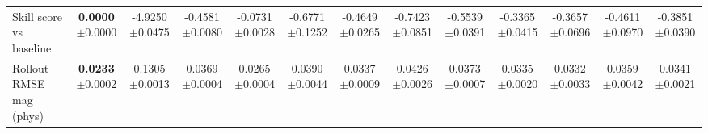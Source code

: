 \begin{table}[t]
{\begin{tabular}{lcccccccccccc}
Skill score vs baseline & \makecell{\textbf{0.0000}\\[-2pt]{\scriptsize$\pm$0.0000}} & \makecell{-4.9250\\[-2pt]{\scriptsize$\pm$0.0475}} & \makecell{-0.4581\\[-2pt]{\scriptsize$\pm$0.0080}} & \makecell{-0.0731\\[-2pt]{\scriptsize$\pm$0.0028}} & \makecell{-0.6771\\[-2pt]{\scriptsize$\pm$0.1252}} & \makecell{-0.4649\\[-2pt]{\scriptsize$\pm$0.0265}} & \makecell{-0.7423\\[-2pt]{\scriptsize$\pm$0.0851}} & \makecell{-0.5539\\[-2pt]{\scriptsize$\pm$0.0391}} & \makecell{-0.3365\\[-2pt]{\scriptsize$\pm$0.0415}} & \makecell{-0.3657\\[-2pt]{\scriptsize$\pm$0.0696}} & \makecell{-0.4611\\[-2pt]{\scriptsize$\pm$0.0970}} & \makecell{-0.3851\\[-2pt]{\scriptsize$\pm$0.0390}} \\
Rollout RMSE mag (phys) & \makecell{\textbf{0.0233}\\[-2pt]{\scriptsize$\pm$0.0002}} & \makecell{0.1305\\[-2pt]{\scriptsize$\pm$0.0013}} & \makecell{0.0369\\[-2pt]{\scriptsize$\pm$0.0004}} & \makecell{0.0265\\[-2pt]{\scriptsize$\pm$0.0004}} & \makecell{0.0390\\[-2pt]{\scriptsize$\pm$0.0044}} & \makecell{0.0337\\[-2pt]{\scriptsize$\pm$0.0009}} & \makecell{0.0426\\[-2pt]{\scriptsize$\pm$0.0026}} & \makecell{0.0373\\[-2pt]{\scriptsize$\pm$0.0007}} & \makecell{0.0335\\[-2pt]{\scriptsize$\pm$0.0020}} & \makecell{0.0332\\[-2pt]{\scriptsize$\pm$0.0033}} & \makecell{0.0359\\[-2pt]{\scriptsize$\pm$0.0042}} & \makecell{0.0341\\[-2pt]{\scriptsize$\pm$0.0021}} \\

\end{tabular}}
\end{table}
